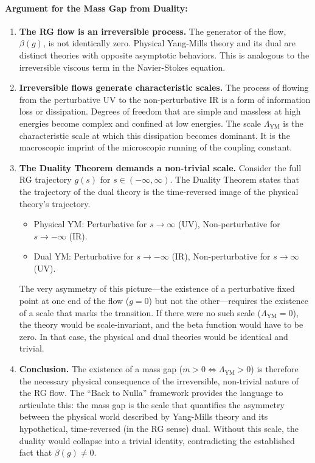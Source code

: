 \paragraph{Argument for the Mass Gap from Duality:}
\begin{enumerate}
    \item \textbf{The RG flow is an irreversible process.} The generator of the flow, $\beta(g)$, is not identically zero. Physical Yang-Mills theory and its dual are distinct theories with opposite asymptotic behaviors. This is analogous to the irreversible viscous term in the Navier-Stokes equation.
    
    \item \textbf{Irreversible flows generate characteristic scales.} The process of flowing from the perturbative UV to the non-perturbative IR is a form of information loss or dissipation. Degrees of freedom that are simple and massless at high energies become complex and confined at low energies. The scale $\Lambda_{\text{YM}}$ is the characteristic scale at which this dissipation becomes dominant. It is the macroscopic imprint of the microscopic running of the coupling constant.
    
    \item \textbf{The Duality Theorem demands a non-trivial scale.} Consider the full RG trajectory $g(s)$ for $s \in (-\infty, \infty)$. The Duality Theorem states that the trajectory of the dual theory is the time-reversed image of the physical theory's trajectory.
    \begin{itemize}
        \item Physical YM: Perturbative for $s \to \infty$ (UV), Non-perturbative for $s \to -\infty$ (IR).
        \item Dual YM: Perturbative for $s \to -\infty$ (IR), Non-perturbative for $s \to \infty$ (UV).
    \end{itemize}
    The very asymmetry of this picture—the existence of a perturbative fixed point at one end of the flow ($g=0$) but not the other—requires the existence of a scale that marks the transition. If there were no such scale ($\Lambda_{\text{YM}}=0$), the theory would be scale-invariant, and the beta function would have to be zero. In that case, the physical and dual theories would be identical and trivial.

    \item \textbf{Conclusion.} The existence of a mass gap ($m > 0 \iff \Lambda_{\text{YM}} > 0$) is therefore the necessary physical consequence of the irreversible, non-trivial nature of the RG flow. The ``Back to Nulla'' framework provides the language to articulate this: the mass gap is the scale that quantifies the asymmetry between the physical world described by Yang-Mills theory and its hypothetical, time-reversed (in the RG sense) dual. Without this scale, the duality would collapse into a trivial identity, contradicting the established fact that $\beta(g) \neq 0$.
\end{enumerate}

